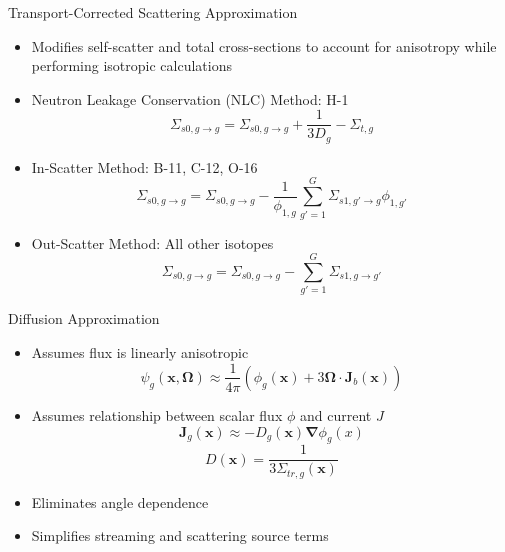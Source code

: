 
\begin{frame}[t]{Transport-Corrected Scattering Approximation}

  \begin{itemize}
    \item Modifies self-scatter and total cross-sections to account for 
    anisotropy while performing isotropic calculations
    \item Neutron Leakage Conservation (NLC) Method: H-1
    \begin{equation*}
    \Sigma_{s0,g\rightarrow g} = \Sigma_{s0,g\rightarrow g} + \frac{1}{3D_g} 
    - \Sigma_{t,g}
    \end{equation*}
    \item In-Scatter Method: B-11, C-12, O-16
    \begin{equation*}
    \Sigma_{s0,g\rightarrow g} = \Sigma_{s0,g\rightarrow g} - 
    \frac{1}{\phi_{1,g}}\sum_{g'=1}^G \Sigma_{s1,g'\rightarrow g}\phi_{1,g'}
    \end{equation*}
    \item Out-Scatter Method: All other isotopes
    \begin{equation*}
    \Sigma_{s0,g\rightarrow g} = \Sigma_{s0,g\rightarrow g} - \sum_{g'=1}^G 
    \Sigma_{s1,g\rightarrow g'}
    \end{equation*}
  \end{itemize}

\end{frame}


\begin{frame}[t]{Diffusion Approximation}
    
    \begin{itemize}
      \item Assumes flux is linearly anisotropic
      \begin{equation*}
       \psi_g\left(\bm x,\bm \Omega\right) \approx 
       \frac{1}{4\pi}\left(\phi_g\left(\bm x\right) + 3\bm \Omega \cdot \bm 
       J_b\left(\bm x\right)\right)
      \end{equation*}
      \item Assumes relationship between scalar flux $\phi$ and current $J$
      \begin{equation*}
      \bm J_g\left(\bm x\right) \approx -D_g\left(\bm x\right) \bm \nabla 
      \phi_g\left(x\right)
      \end{equation*}
      \begin{equation*}
      D\left(\bm x\right)  = \frac{1}{3\Sigma_{tr,g}\left(\bm 
      x\right)}
      \end{equation*}
      \item Eliminates angle dependence
      \item Simplifies streaming and scattering source terms
    \end{itemize}
  
\end{frame}

